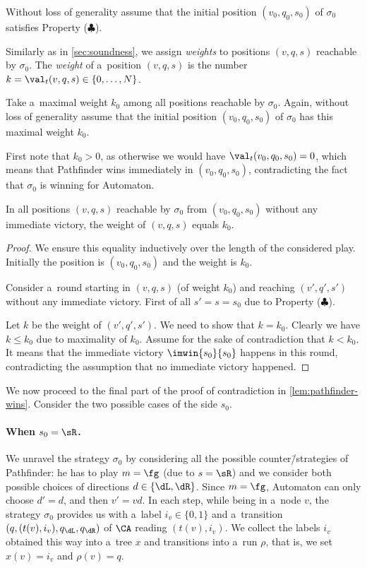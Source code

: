 Without loss of generality assume that the initial position $(v_0,q_0,s_0)$ of $\sigma_0$ satisfies Property ($\clubsuit$).

Similarly as in \cref{sec:soundness}, we assign \emph{weights} to positions $(v,q,s)$ reachable by $\sigma_0$.
The \emph{weight} of a~position $(v,q,s)$ is the number $k=\val_t(v,q,s)\in\{0,\ldots,N\}$.

Take a~maximal weight $k_0$ among all positions reachable by $\sigma_0$.
Again, without loss of generality assume that the initial position $(v_0,q_0,s_0)$ of $\sigma_0$ has this maximal weight $k_0$.

First note that $k_0>0$, as otherwise we would have $\val_t(v_0,q_0,s_0)=0$, which means that Pathfinder wins immediately in $(v_0,q_0,s_0)$, contradicting the fact that $\sigma_0$ is winning for Automaton.

\begin{clm}
\label{cl:no-change-weight}
In all positions $(v,q,s)$ reachable by $\sigma_0$ from $(v_0,q_0,s_0)$ without any immediate victory, the weight of $(v,q,s)$ equals $k_0$.
\end{clm}

\begin{proof}
We ensure this equality inductively over the length of the considered play.
Initially the position is $(v_0,q_0,s_0)$ and the weight is $k_0$.

Consider a~round starting in $(v,q,s)$ (of weight $k_0$) and reaching $(v',q',s')$ without any immediate victory.
First of all $s'=s=s_0$ due to Property ($\clubsuit$).

Let $k$ be the weight of $(v',q',s')$.
We need to show that $k=k_0$.
Clearly we have $k\leq k_0$ due to maximality of $k_0$.
Assume for the sake of contradiction that $k<k_0$.
It means that the immediate victory $\imwin{s_0}{s_0}$ happens in this round, contradicting the assumption that no immediate victory happened.
\end{proof}

We now proceed to the final part of the proof of contradiction in \cref{lem:pathfinder-wins}.
Consider the two possible cases of the side $s_0$.


\paragraph*{When $s_0=\sR$.}

We unravel the strategy $\sigma_0$ by considering all the possible counter\=/strategies of Pathfinder:
he has to play $m=\fg$ (due to $s=\sR$) and we consider both possible choices of directions $d\in\{\dL,\dR\}$.
Since $m=\fg$, Automaton can only choose $d'=d$, and then $v'=vd$.
In each step, while being in a~node $v$, the strategy $\sigma_0$ provides us with a~label $i_v\in\{0,1\}$ and a~transition $(q,(t(v),i_v),q_\dL,q_\dR)$ of $\CA$ reading $(t(v),i_v)$.
We collect the labels $i_v$ obtained this way into a~tree $x$ and transitions into a~run $\rho$, that is, we set $x(v)=i_v$ and $\rho(v)=q$.

